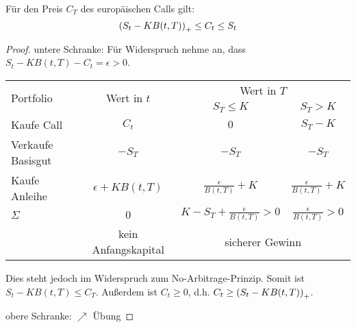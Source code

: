 \begin{lemma} %
	Für den Preis $C_T$ des europäischen Calls gilt:
	\begin{equation*}
		\left( S_t - K B(t,T) \right)_+ \le C_t \le S_t
	\end{equation*}
\end{lemma}
\begin{proof}
	untere Schranke: Für Widerspruch nehme an, dass $S_t - K B(t,T) - C_t = \epsilon > 0$.
	
	\begin{center}
		\begin{tabular}{|l|c|cc|} %
			\hline \multirow{2}{*}{Portfolio} & \multirow{2}{*}{Wert in $t$} & \multicolumn{2}{c|}{Wert in $T$} \\
			&& $S_T \le K$ & $S_T > K$ \\ \hline \hline
			Kaufe Call & $C_t$ & $0$ & $S_T - K$ \\
			Verkaufe Basisgut & $-S_T$ & $-S_T$ & $-S_T$ \\
			Kaufe Anleihe & $\epsilon + K B(t,T)$ & $\frac{\epsilon}{B(t,T)} + K$ &  $\frac{\epsilon}{B(t,T)} + K$ \\ \hline
			$\Sigma$ & $0$ & $K - S_T + \frac{\epsilon}{B(t,T)} > 0$ & $\frac{\epsilon}{B(t,T)} > 0$ \\
			& kein Anfangskapital & \multicolumn{2}{c|}{sicherer Gewinn}\\ \hline
		\end{tabular}
	\end{center}

	Dies steht jedoch im Widerspruch zum No-Arbitrage-Prinzip. Somit ist $S_t - K B(t,T) \le C_T$. Außerdem ist $C_t \ge 0$, d.h. $C_t \ge \left( S_t - K B(t,T) \right)_+$.
	
	obere Schranke: $\nearrow$ Übung
\end{proof}

